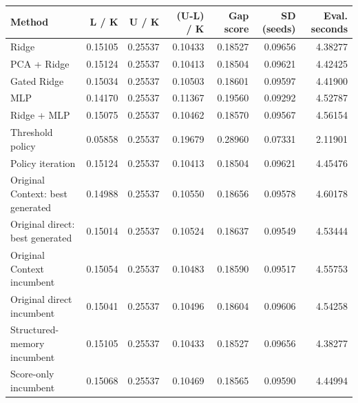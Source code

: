 \begin{tabular}{lrrrrrr}
\toprule
Method & L / K & U / K & (U-L) / K & Gap score & SD (seeds) & Eval. seconds \\
\midrule
Ridge & 0.15105 & 0.25537 & 0.10433 & 0.18527 & 0.09656 & 4.38277 \\
PCA + Ridge & 0.15124 & 0.25537 & 0.10413 & 0.18504 & 0.09621 & 4.42425 \\
Gated Ridge & 0.15034 & 0.25537 & 0.10503 & 0.18601 & 0.09597 & 4.41900 \\
MLP & 0.14170 & 0.25537 & 0.11367 & 0.19560 & 0.09292 & 4.52787 \\
Ridge + MLP & 0.15075 & 0.25537 & 0.10462 & 0.18570 & 0.09567 & 4.56154 \\
Threshold policy & 0.05858 & 0.25537 & 0.19679 & 0.28960 & 0.07331 & 2.11901 \\
Policy iteration & 0.15124 & 0.25537 & 0.10413 & 0.18504 & 0.09621 & 4.45476 \\
Original Context: best generated & 0.14988 & 0.25537 & 0.10550 & 0.18656 & 0.09578 & 4.60178 \\
Original direct: best generated & 0.15014 & 0.25537 & 0.10524 & 0.18637 & 0.09549 & 4.53444 \\
Original Context incumbent & 0.15054 & 0.25537 & 0.10483 & 0.18590 & 0.09517 & 4.55753 \\
Original direct incumbent & 0.15041 & 0.25537 & 0.10496 & 0.18604 & 0.09606 & 4.54258 \\
Structured-memory incumbent & 0.15105 & 0.25537 & 0.10433 & 0.18527 & 0.09656 & 4.38277 \\
Score-only incumbent & 0.15068 & 0.25537 & 0.10469 & 0.18565 & 0.09590 & 4.44994 \\
\bottomrule
\end{tabular}
